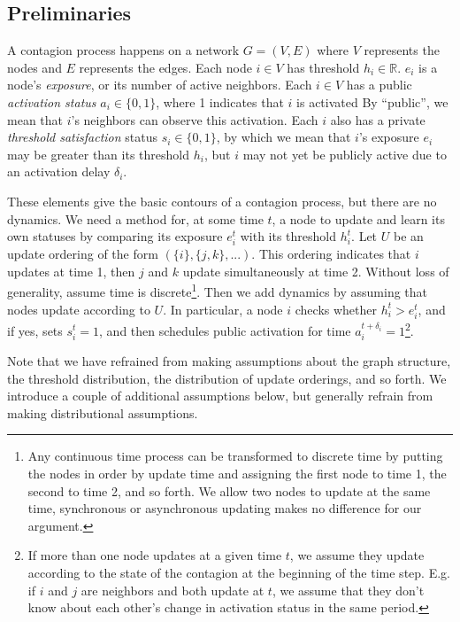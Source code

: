 \documentclass[a4paper]{article}
\begin{document}
\subsection{Preliminaries}

A contagion process happens on a network $G = (V, E)$ where $V$ represents the nodes and $E$ represents the edges. Each node $i \in V$ has threshold $h_i \in \mathbb{R}$. $e_i$ is a node's \emph{exposure}, or its number of active neighbors. Each $i \in V$ has a public \emph{activation status} $a_i \in \{0, 1\}$, where 1 indicates that $i$ is activated By ``public'', we mean that $i$'s neighbors can observe this activation. Each $i$ also has a private \emph{threshold satisfaction} status $s_i \in \{0, 1\}$, by which we mean that $i$'s exposure $e_i$ may be greater than its threshold $h_i$, but $i$ may not yet be publicly active due to an activation delay $\delta_i$.

These elements give the basic contours of a contagion process, but there are no dynamics. We need a method for, at some time $t$, a node to update and learn its own statuses by comparing its exposure $e_i^t$ with its threshold $h_i^t$. Let $U$ be an update ordering of the form $(\{i\}, \{j, k\}, ...)$. This ordering indicates that $i$ updates at time 1, then $j$ and $k$ update simultaneously at time 2. Without loss of generality, assume time is discrete\footnote{Any continuous time process can be transformed to discrete time by putting the nodes in order by update time and assigning the first node to time 1, the second to time 2, and so forth. We allow two nodes to update at the same time, synchronous or asynchronous updating makes no difference for our argument.}. Then we add dynamics by assuming that nodes update according to $U$. In particular, a node $i$ checks whether $h^t_i > e^t_i$, and if yes, sets $s^t_i = 1$, and then schedules public activation for time $a^{t+\delta_i}_i = 1$\footnote{If more than one node updates at a given time $t$, we assume they update according to the state of the contagion at the beginning of the time step. E.g. if $i$ and $j$ are neighbors and both update at $t$, we assume that they don't know about each other's change in activation status in the same period.}.

Note that we have refrained from making assumptions about the graph structure, the threshold distribution, the distribution of update orderings, and so forth. We introduce a couple of additional assumptions below, but generally refrain from making distributional assumptions.
\end{document}

